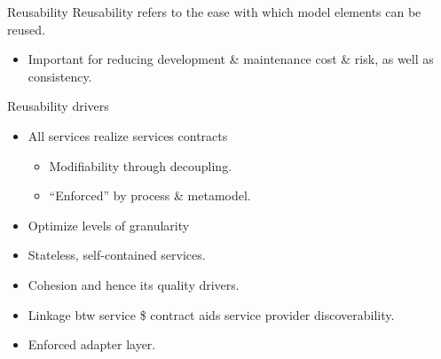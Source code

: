 \begin{frame}{Reusability}
  Reusability refers to the ease with which model elements can be reused.
    \begin{itemize}
     \item Important for reducing development \& maintenance cost \& risk, as well as consistency.
    \end{itemize}
  \pause
  \begin{block}{Reusability drivers}
	 \begin{itemize}
	 \item<+-| alert@+> All services realize services contracts
		  \begin{itemize}
			 \item Modifiability through decoupling.
			 \item ``Enforced'' by process \& metamodel.
		  \end{itemize}
		\item<+-| alert@+> Optimize levels of granularity
		\item<+-| alert@+> Stateless, self-contained services.
		\item<+-| alert@+> Cohesion and hence its quality drivers.
		\item<+-| alert@+> Linkage btw service \$ contract aids service provider discoverability.
		\item<+-| alert@+> Enforced adapter layer.
	 \end{itemize}
  \end{block}
\end{frame}

